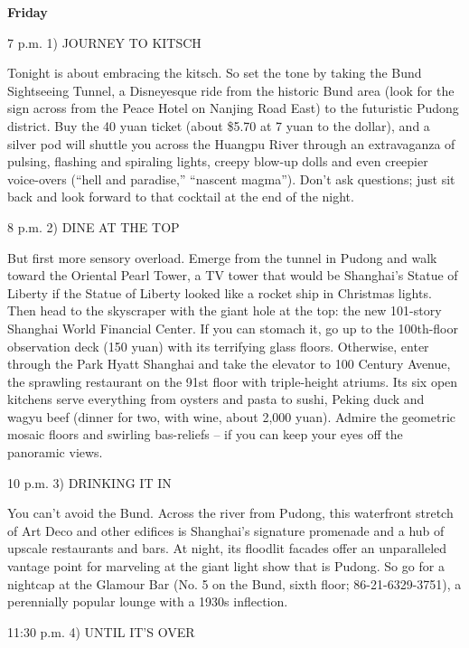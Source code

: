 \documentclass[12pt,a4paper,onecolumn]{article}
\begin{document}
\begin{CJK*}{GBK}{song}
\textbf{Friday}
\begin{description}
\item{7 p.m.} 1) JOURNEY TO KITSCH

Tonight is about embracing the kitsch. So set the tone by taking the Bund Sightseeing Tunnel, a
Disneyesque ride from the historic Bund area (look for the sign across from the Peace Hotel on
Nanjing Road East) to the futuristic Pudong district. Buy the 40 yuan ticket (about \$5.70 at 7 yuan
to the dollar), and a silver pod will shuttle you across the Huangpu River through an extravaganza
of pulsing, flashing and spiraling lights, creepy blow-up dolls and even creepier voice-overs
(``hell and paradise,'' ``nascent magma''). Don't ask questions; just sit back and look forward to
that cocktail at the end of the night.

\item{8 p.m.} 2) DINE AT THE TOP

But first more sensory overload. Emerge from the tunnel in Pudong and walk toward the Oriental Pearl
Tower, a TV tower that would be Shanghai's Statue of Liberty if the Statue of Liberty looked like a
rocket ship in Christmas lights. Then head to the skyscraper with the giant hole at the top: the new
101-story Shanghai World Financial Center. If you can stomach it, go up to the 100th-floor
observation deck (150 yuan) with its terrifying glass floors. Otherwise, enter through the Park
Hyatt Shanghai and take the elevator to 100 Century Avenue, the sprawling restaurant on the 91st
floor with triple-height atriums. Its six open kitchens serve everything from oysters and pasta to
sushi, Peking duck and wagyu beef (dinner for two, with wine, about 2,000 yuan). Admire the
geometric mosaic floors and swirling bas-reliefs -- if you can keep your eyes off the panoramic
views.

\item{10 p.m.} 3) DRINKING IT IN

You can't avoid the Bund. Across the river from Pudong, this waterfront stretch of Art Deco and
other edifices is Shanghai's signature promenade and a hub of upscale restaurants and bars. At
night, its floodlit facades offer an unparalleled vantage point for marveling at the giant light
show that is Pudong. So go for a nightcap at the Glamour Bar (No. 5 on the Bund, sixth floor;
86-21-6329-3751), a perennially popular lounge with a 1930s inflection.

\item{11:30 p.m.} 4) UNTIL IT'S OVER


\end{description}
\end{CJK*}
\end{document}
